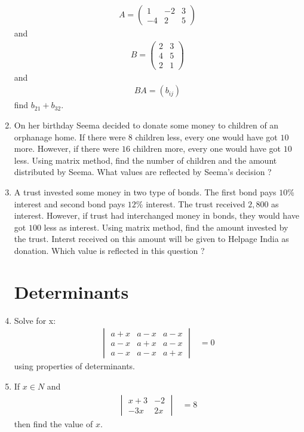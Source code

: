 \documentclass[12pt,-letter paper]{article}
\theoremstyle{remark}
\providecommand{\brak}[1]{\ensuremath{\left(#1\right)}}
\newcommand{\myvec}[1]{\ensuremath{\begin{pmatrix}#1\end{pmatrix}}}
\newcommand{\mydet}[1]{\ensuremath{\begin{vmatrix}#1\end{vmatrix}}}
\begin{document}
\begin{enumerate}
            \begin{align*}
                  A=\myvec{1 & -2 & 3 \\-4&2&5}
            \end{align*}
            and
            \begin{align*}
                  B=\myvec{2 & 3 \\4&5\\2&1}
            \end{align*}
            and
            \begin{align*}
                  BA=\brak{b_{ij}}
            \end{align*}
            find $b_{21} + b_{32}$.
      \item On her birthday Seema decided to donate some money to children of an orphanage home. If there were $8$ children less, every one would have got \rupee $10$ more. However, if there were $16$ children more, every one would have got \rupee $10$ less. Using matrix method, find the number of children and the amount distributed by Seema. What values are reflected by Seema's decision ?
      \item A trust invested some money in two type of bonds. The first bond pays $10$\% interest and second bond pays $12$\% interest. The trust received \rupee $2,800$ as interest. However, if trust had interchanged money in bonds, they would have got \rupee $100$ less as interest. Using matrix method, find the amount invested by the trust. Interst received on this amount will be given to Helpage India as donation. Which value is reflected in this question ?
            \section{Determinants}
      \item Solve for x:
            \begin{align*}
                  \mydet{a+x & a-x & a-x \\a-x&a+x& a-x\\a-x & a-x & a+x} &=0
            \end{align*}
            using properties of determinants.
      \item If $x \in N$ and
            \begin{align*}
                  \mydet{x+3 & -2 \\ -3x & 2x} &= 8
            \end{align*}
            then find the value of $x$.


\end{enumerate}
\end{document}
